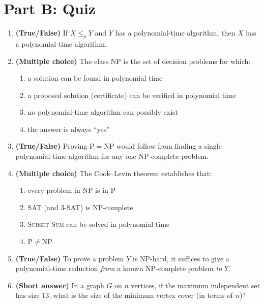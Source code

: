 \documentclass[11pt]{article}
\begin{document}
\newpage
\section*{Part B: Quiz}

\begin{enumerate}[label=\textbf{B\arabic*.}, leftmargin=2.2em]

\item \textbf{(True/False)} If $X \le_p Y$ and $Y$ has a polynomial-time algorithm, then
$X$ has a polynomial-time algorithm.

\item \textbf{(Multiple choice)} The class $\mathrm{NP}$ is the set of decision problems
for which:
\begin{enumerate}[label=(\alph*)]
    \item a solution can be found in polynomial time
    \item a proposed solution (certificate) can be verified in polynomial time
    \item no polynomial-time algorithm can possibly exist
    \item the answer is always ``yes''
\end{enumerate}

\item \textbf{(True/False)} Proving $\mathrm{P} = \mathrm{NP}$ would follow from finding a
single polynomial-time algorithm for any one NP-complete problem.

\item \textbf{(Multiple choice)} The Cook--Levin theorem establishes that:
\begin{enumerate}[label=(\alph*)]
    \item every problem in $\mathrm{NP}$ is in $\mathrm{P}$
    \item \textsc{SAT} (and \textsc{3-SAT}) is NP-complete
    \item \textsc{Subset Sum} can be solved in polynomial time
    \item $\mathrm{P} \ne \mathrm{NP}$
\end{enumerate}

\item \textbf{(True/False)} To prove a problem $Y$ is NP-hard, it suffices to give a
polynomial-time reduction \emph{from} a known NP-complete problem \emph{to} $Y$.

\item \textbf{(Short answer)} In a graph $G$ on $n$ vertices, if the maximum independent
set has size $13$, what is the size of the minimum vertex cover (in terms of $n$)?


\end{enumerate}
\end{document}
